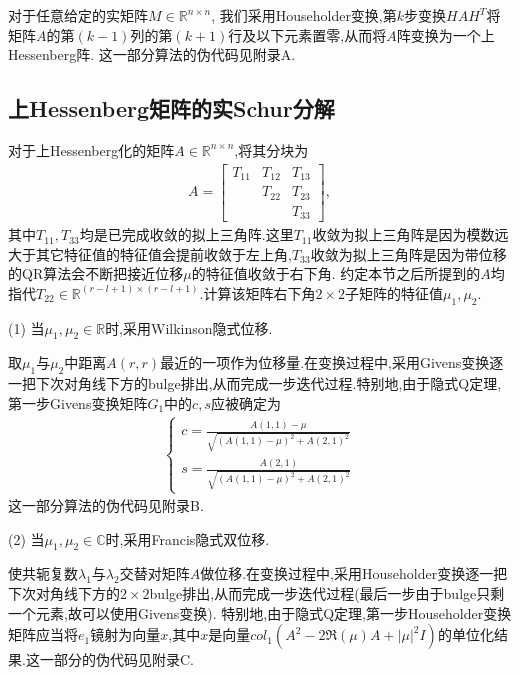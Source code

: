 \documentclass[12pt, a4paper, oneside]{ctexart}
\begin{document}
对于任意给定的实矩阵$M \in \mathbb{R}^{n \times n}$, 我们采用Householder变换,第$k$步变换$HAH^T$将矩阵$A$的第$(k-1)$列的第$(k+1)$行及以下元素置零,从而将$A$阵变换为一个上Hessenberg阵.
这一部分算法的伪代码见附录A.

\subsection{上Hessenberg矩阵的实Schur分解}

对于上Hessenberg化的矩阵$A \in \mathbb{R}^{n \times n}$,将其分块为
\begin{align*}
    A = \left[
        \begin{array}{ccc}	
            T_{11} & T_{12} & T_{13} \\
                   & T_{22} & T_{23} \\
                   &        & T_{33}
        \end{array}
    \right],
\end{align*}
其中$T_{11},T_{33}$均是已完成收敛的拟上三角阵.这里$T_{11}$收敛为拟上三角阵是因为模数远大于其它特征值的特征值会提前收敛于左上角,$T_{33}$收敛为拟上三角阵是因为带位移的QR算法会不断把接近位移$\mu$的特征值收敛于右下角.
约定本节之后所提到的$A$均指代$T_{22}\in \mathbb{R}^{(r-l+1) \times (r-l+1)}$.计算该矩阵右下角$2 \times 2$子矩阵的特征值$\mu_1, \mu_2$. \par
(1) 当$\mu_1,\mu_2 \in \mathbb{R}$时,采用Wilkinson隐式位移.\par
取$\mu_1$与$\mu_2$中距离$A(r, r)$最近的一项作为位移量.在变换过程中,采用Givens变换逐一把下次对角线下方的bulge排出,从而完成一步迭代过程.特别地,由于隐式Q定理,第一步Givens变换矩阵$G_1$中的$c,s$应被确定为
\begin{align}
    \left\{
        \begin{array}{ll}
            c = \frac{A(1, 1) - \mu}{\sqrt{(A(1, 1) - \mu)^2 + A(2, 1)^2}} \\
            s = \frac{A(2, 1)}{\sqrt{(A(1, 1) - \mu)^2 + A(2, 1)^2}}
        \end{array}
    \right.
\end{align}
这一部分算法的伪代码见附录B.

(2) 当$\mu_1,\mu_2 \in \mathbb{C}$时,采用Francis隐式双位移.\par
使共轭复数$\lambda_1$与$\lambda_2$交替对矩阵$A$做位移.在变换过程中,采用Householder变换逐一把下次对角线下方的$2 \times 2$bulge排出,从而完成一步迭代过程(最后一步由于bulge只剩一个元素,故可以使用Givens变换).
特别地,由于隐式Q定理,第一步Householder变换矩阵应当将$e_1$镜射为向量$x$,其中$x$是向量$col_1(A^2-2\Re(\mu)A+|\mu|^2I)$的单位化结果.这一部分的伪代码见附录C.
\end{document}
